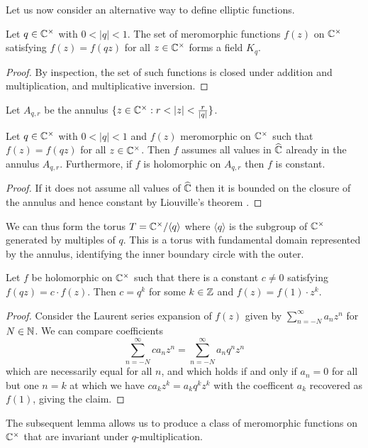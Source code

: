 Let us now consider an alternative way to define elliptic functions. 
\begin{proposition}\label{prop: set of annulus functions form a field}
    Let $q\in\mathbb{C}^{\times}$ with $0<|q|<1$. The set of meromorphic functions $f(z)$ on $\mathbb{C}^{\times}$ satisfying $f(z)=f(qz)$ for all $z\in\mathbb{C}^{\times}$ forms a field $K_{q}$. 
\end{proposition}
\begin{proof}
    By inspection, the set of such functions is closed under addition and multiplication, and multiplicative inversion. 
\end{proof}
Let $A_{q,r}$ be the annulus $\{z\in\CC^{\times}:r<|z|<\frac{r}{|q|}\}$. 
\begin{lemma}\label{lem: assumes all values in annulus}
    Let $q\in\mathbb{C}^{\times}$ with $0<|q|<1$ and $f(z)$ meromorphic on $\mathbb{C}^{\times}$ such that $f(z)=f(qz)$ for all $z\in\mathbb{C}^{\times}$. Then $f$ assumes all values in $\widehat{\mathbb{C}}$ already in the annulus $A_{q,r}$. Furthermore, if $f$ is holomorphic on $A_{q,r}$ then $f$ is constant. 
\end{lemma}
\begin{proof}
    If it does not assume all values of $\widehat{\mathbb{C}}$ then it is bounded on the closure of the annulus and hence constant by Liouville's theorem . 
\end{proof}
We can thus form the torus $T=\mathbb{C}^{\times}/\langle q\rangle$ where $\langle q\rangle$ is the subgroup of $\mathbb{C}^{\times}$ generated by multiples of $q$. This is a torus with fundamental domain represented by the annulus, identifying the inner boundary circle with the outer. 
\begin{lemma}\label{lem: q-invariant implies q-power-multiple}
    Let $f$ be holomorphic on $\mathbb{C}^{\times}$ such that there is a constant $c\neq0$ satisfying $f(qz)=c\cdot f(z)$. Then $c=q^{k}$ for some $k\in\mathbb{Z}$ and $f(z)=f(1)\cdot z^{k}$. 
\end{lemma}
\begin{proof}
    Consider the Laurent series expansion of $f(z)$ given by $\sum_{n=-N}^{\infty}a_{n}z^{n}$ for $N\in\mathbb{N}$. We can compare coefficients 
    $$\sum_{n=-N}^{\infty}ca_{n}z^{n}=\sum_{n=-N}^{\infty}a_{n}q^{n}z^{n}$$
    which are necessarily equal for all $n$, and which holds if and only if $a_{n}=0$ for all but one $n=k$ at which we have $ca_{k}z^{k}=a_{k}q^{k}z^{k}$ with the coefficent $a_{k}$ recovered as $f(1)$, giving the claim. 
\end{proof}
The subsequent lemma allows us to produce a class of meromorphic functions on $\mathbb{C}^{\times}$ that are invariant under $q$-multiplication. 
